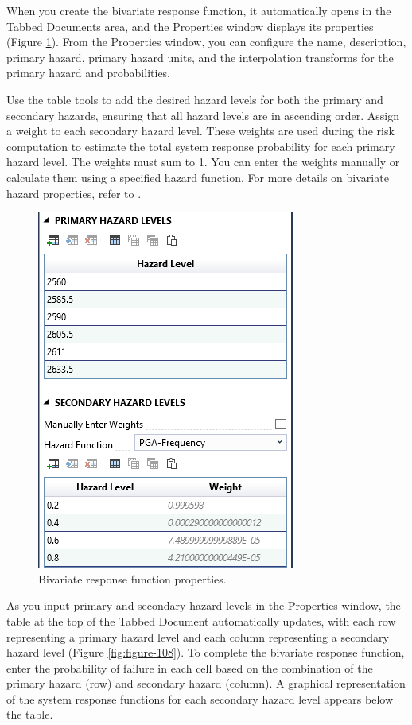 \documentclass[
]{book}
\begin{document}
When you create the bivariate response function, it automatically opens in the Tabbed Documents area, and the Properties window displays its properties (Figure \ref{fig:figure-107}). From the Properties window, you can configure the name, description, primary hazard, primary hazard units, and the interpolation transforms for the primary hazard and probabilities.

Use the table tools to add the desired hazard levels for both the primary and secondary hazards, ensuring that all hazard levels are in ascending order. Assign a weight to each secondary hazard level. These weights are used during the risk computation to estimate the total system response probability for each primary hazard level. The weights must sum to 1. You can enter the weights manually or calculate them using a specified hazard function. For more details on bivariate hazard properties, refer to \citep{cite-TechRef}.

\begin{figure}

{\centering \includegraphics{images/figure107} 

}

\caption{Bivariate response function properties.}\label{fig:figure-107}
\end{figure}

As you input primary and secondary hazard levels in the Properties window, the table at the top of the Tabbed Document automatically updates, with each row representing a primary hazard level and each column representing a secondary hazard level (Figure \ref{fig:figure-108}). To complete the bivariate response function, enter the probability of failure in each cell based on the combination of the primary hazard (row) and secondary hazard (column). A graphical representation of the system response functions for each secondary hazard level appears below the table.
\end{document}
